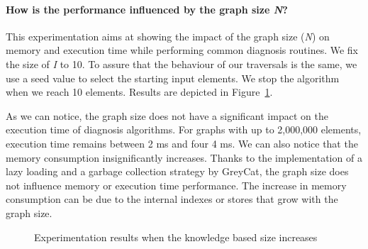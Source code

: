 \paragraph{How is the performance influenced by the graph size \textit{N}?}
This experimentation aims at showing the impact of the graph size (\textit{N}) on memory and execution time while performing common diagnosis routines.
We fix the size of \textit{I} to 10. To assure that the behaviour of our traversals is the same, we use a seed value to select the starting input elements. We stop the algorithm when we reach 10 elements.
Results are depicted in Figure~\ref{fig:exp1}.

As we can notice, the graph size does not have a significant impact on the execution time of diagnosis algorithms.
For graphs with up to 2,000,000 elements, execution time remains between 2 ms and four 4 ms. We can also notice that the memory consumption insignificantly increases.
Thanks to the implementation of a lazy loading and a garbage collection strategy by GreyCat, the graph size does not influence memory or execution time performance. The increase in memory consumption can be due to the internal indexes or stores that grow with the graph size.

\begin{figure}
	\centering
	\hfil
	\caption{Experimentation results when the knowledge based size increases}
	\label{fig:exp1}
\end{figure}

